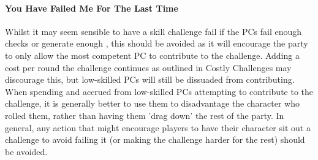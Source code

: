 \begin{multicols}{2}

\paragraph{You Have Failed Me For The Last Time}
Whilst it may seem sensible to have a skill challenge fail if the PCs fail enough checks or generate
enough \despair, this should be avoided as it will encourage the party to only allow the most competent
PC to contribute to the challenge. Adding a cost per round the challenge continues as outlined in Costly
Challenges may discourage this, but low-skilled PCs will still be dissuaded from contributing. When
spending \threat and \despair  accrued from low-skilled PCs attempting to contribute to the challenge,
it is generally better to use them to disadvantage the character who rolled them, rather than having them
'drag down' the rest of the party. In general, any action that might encourage players to have their
character sit out a challenge to avoid failing it (or making the challenge harder for the rest) should be
avoided.


\end{multicols}
